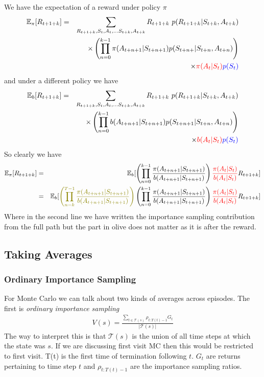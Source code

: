 \documentclass[11pt,a4paper]{article}
\newcommand\bea{\begin{eqnarray}}
\newcommand\eea{\end{eqnarray}}
\newcommand{\nn}{\nonumber \\}
\begin{document}
We have the expectation of a reward under policy $\pi$ 
\bea
\mathbb E_{\pi}[R_{t+1+k}] &=& \sum_{R_{t+1+k}, S_t,A_t, \dots S_{t+k}, A_{t+k}} R_{t+1+k} ~ p(R_{t+1+k}| S_{t+k},A_{t+k}) \nn
&& \times \left( \prod_{n=0}^{k-1} \pi(A_{t+n+1} | S_{t+n+1} ) p( S_{t+n+} | S_{t+n}, A_{t+n}) \right) \nn
&&\times \color{red}{\pi(A_t|S_t)} \color{blue}{p(S_t)} 
\eea
and under a different policy we have
\bea
\mathbb E_{b}[R_{t+1+k}] &=& \sum_{R_{t+1+k}, S_t,A_t, \dots S_{t+k}, A_{t+k}} R_{t+1+k} ~ p(R_{t+1+k}| S_{t+k},A_{t+k}) \nn
&& \times \left( \prod_{n=0}^{k-1} b(A_{t+n+1} | S_{t+n+1} ) p( S_{t+n+1} | S_{t+n}, A_{t+n}) \right) \nn
&&\times \color{red}{b(A_t|S_t)} \color{blue}{p(S_t)} 
\eea
So clearly we have
\bea
\mathbb E_{\pi}[R_{t+1+k}] &=& \mathbb E_{b}[ \left( \prod_{n=0}^{k-1} \frac{\pi(A_{t+n+1} | S_{t+n+1} )}{b(A_{t+n+1} | S_{t+n+1} )} \right) {\color{red}\frac{\pi(A_{t} | S_{t} )}{b(A_{t} | S_{t} )}}   R_{t+1+k}]  \nn
&=&  \mathbb E_{b}[ {\color{olive} \left( \prod_{n=k}^{T-1} \frac{\pi(A_{t+n+1} | S_{t+n+1} )}{b(A_{t+n+1} | S_{t+n+1} )} \right)} \left( \prod_{n=0}^{k-1} \frac{\pi(A_{t+n+1} | S_{t+n+1} )}{b(A_{t+n+1} | S_{t+n+1} )} \right) {\color{red}\frac{\pi(A_{t} | S_{t} )}{b(A_{t} | S_{t} )}}   R_{t+1+k}]  \nn
\eea
Where in the second line we have written the importance sampling contribution from the full path but the part in olive does not matter as it is after the reward. 



\subsection{Taking Averages}

\subsubsection{Ordinary Importance Sampling}

For Monte Carlo we can talk about two kinds of averages across episodes. The first is {\em ordinary importance sampling} 
\bea
V(s) = \frac{\sum_{t \in \mathcal T(s)} \rho_{t:T(t)-1} G_t}{|\mathcal T(s)|}
\eea
The way to interpret this is that $\mathcal T(s)$ is the union of all time steps at which the state was $s$.  If we are discussing first visit MC then this would be restricted to first visit. T(t) is the first time of termination following $t$. $G_t$ are returns pertaining to time step $t$ and $ \rho_{t:T(t)-1}$ are the importance sampling ratios.
\end{document}
